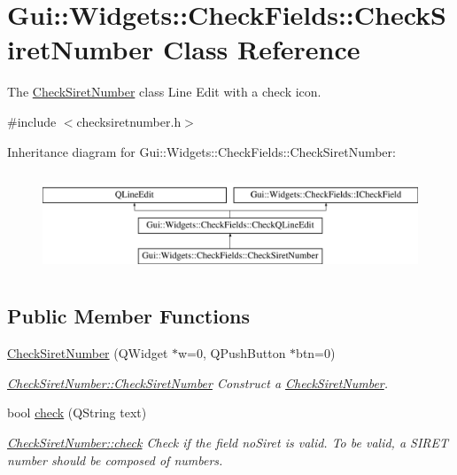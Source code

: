 \hypertarget{classGui_1_1Widgets_1_1CheckFields_1_1CheckSiretNumber}{\section{Gui\-:\-:Widgets\-:\-:Check\-Fields\-:\-:Check\-Siret\-Number Class Reference}
\label{classGui_1_1Widgets_1_1CheckFields_1_1CheckSiretNumber}
}


The \hyperlink{classGui_1_1Widgets_1_1CheckFields_1_1CheckSiretNumber}{Check\-Siret\-Number} class Line Edit with a check icon.  




{\ttfamily \#include $<$checksiretnumber.\-h$>$}

Inheritance diagram for Gui\-:\-:Widgets\-:\-:Check\-Fields\-:\-:Check\-Siret\-Number\-:\begin{figure}[H]
\begin{center}
\leavevmode
\includegraphics[height=3.000000cm]{db/d94/classGui_1_1Widgets_1_1CheckFields_1_1CheckSiretNumber}
\end{center}
\end{figure}
\subsection*{Public Member Functions}
\begin{DoxyCompactItemize}
\item 
\hyperlink{classGui_1_1Widgets_1_1CheckFields_1_1CheckSiretNumber_a084cf5bf5f0630ef0a92a4bb2be8646e}{Check\-Siret\-Number} (Q\-Widget $\ast$w=0, Q\-Push\-Button $\ast$btn=0)
\begin{DoxyCompactList}\small\item\em \hyperlink{classGui_1_1Widgets_1_1CheckFields_1_1CheckSiretNumber_a084cf5bf5f0630ef0a92a4bb2be8646e}{Check\-Siret\-Number\-::\-Check\-Siret\-Number} Construct a \hyperlink{classGui_1_1Widgets_1_1CheckFields_1_1CheckSiretNumber}{Check\-Siret\-Number}. \end{DoxyCompactList}\item 
bool \hyperlink{classGui_1_1Widgets_1_1CheckFields_1_1CheckSiretNumber_a973f81b959d34b28818159303932f5f8}{check} (Q\-String text)
\begin{DoxyCompactList}\small\item\em \hyperlink{classGui_1_1Widgets_1_1CheckFields_1_1CheckSiretNumber_a973f81b959d34b28818159303932f5f8}{Check\-Siret\-Number\-::check} Check if the field no\-Siret is valid. To be valid, a S\-I\-R\-E\-T number should be composed of numbers. \end{DoxyCompactList}\end{DoxyCompactItemize}

